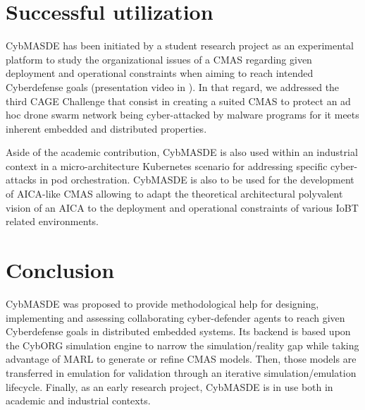 \documentclass[sigconf]{aamas}
\begin{document}

\section{Successful utilization}

CybMASDE has been initiated by a student research project as an experimental platform to study the organizational issues of a CMAS regarding given deployment and operational constraints when aiming to reach intended Cyberdefense goals (presentation video in \cite{Soule2023-video}). In that regard, we addressed the third CAGE Challenge\cite{cage_challenge_3_announcement2022} that consist in creating a suited CMAS to protect an ad hoc drone swarm network being cyber-attacked by malware programs for it meets inherent embedded and distributed properties.


Aside of the academic contribution, CybMASDE is also used within an industrial context in a micro-architecture Kubernetes scenario for addressing specific cyber-attacks in pod orchestration. CybMASDE is also to be used for the development of AICA-like CMAS allowing to adapt the theoretical architectural polyvalent vision of an AICA to the deployment and operational constraints of various IoBT related environments.




\section{Conclusion}

CybMASDE was proposed to provide methodological help for designing, implementing and assessing collaborating cyber-defender agents to reach given Cyberdefense goals in distributed embedded systems. Its backend is based upon the CybORG simulation engine to narrow the simulation/reality gap while taking advantage of MARL to generate or refine CMAS models.
Then, those models are transferred in emulation for validation through an iterative simulation/emulation lifecycle. Finally, as an early research project, CybMASDE is in use both in academic and industrial contexts.
\end{document}
